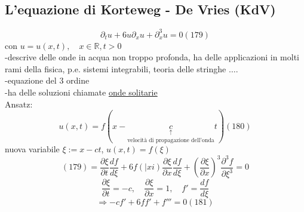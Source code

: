 \documentclass[a4paper,11pt]{report}
\newcommand{\R}{\mathbb{R}}
\begin{document}
\subsection{L'equazione di Korteweg - De Vries (KdV)}
\begin{equation}
\partial_t u + 6u\partial_xu+\partial^3_x u=0 (179)
\end{equation}
con $u=u(x,t), \quad x\in \R, t>0$\\
-descrive delle onde in acqua non troppo profonda, ha delle applicazioni in molti rami della fisica, p.e. sistemi integrabili, teoria delle stringhe $\dots$.\\
-equazione del 3 ordine\\
-ha delle soluzioni chiamate \underline{onde solitarie}\\
Ansatz: 
\begin{equation}
u(x,t)=f(x-\underset{\text{velocità di propagazione dell'onda}}{\underset{\uparrow}{c}}t) (180)
\end{equation}
nuova variabile $\xi:= x-ct$, $u(x,t)=f(\xi)$
$$
(179)= \dfrac{\partial \xi}{\partial t}\dfrac{df}{d\xi}+6f(|xi)\dfrac{\partial \xi}{\partial x}\dfrac{df}{d\xi}+ \left(\dfrac{\partial \xi}{\partial x}  \right)^3\dfrac{\partial^3 f}{\partial \xi ^3}=0
$$
$$
\dfrac{\partial \xi}{\partial t}=-c, \quad \dfrac{\partial \xi}{\partial x}=1, \quad f'=\dfrac{df}{d\xi}
$$
\begin{equation}
\Rightarrow -cf' + 6ff' + f'''=0 (181)
\end{equation}
\end{document}
